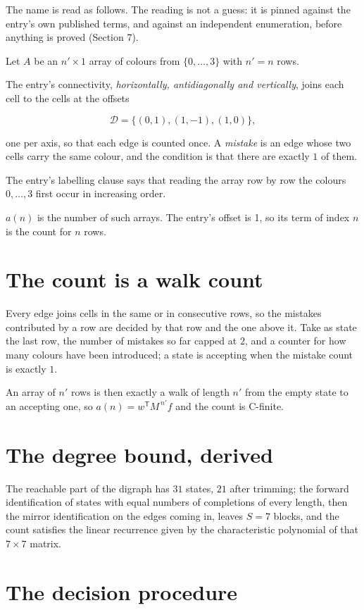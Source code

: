 \documentclass[11pt]{article}
\theoremstyle{definition}
\begin{document}
The name is read as follows. The reading is not a guess: it is pinned against the entry's own published terms, and against an independent enumeration, before anything is proved (Section 7).

Let $A$ be an $n' \times 1$ array of colours from $\{0,\dots,3\}$ with $n' = n$ rows.

The entry's connectivity, {\itshape horizontally, antidiagonally and vertically}, joins each cell to the cells at the offsets

\[\mathcal{D} = \{(0,1), (1,-1), (1,0)\},\]

one per axis, so that each edge is counted once. A {\itshape mistake} is an edge whose two cells carry the same colour, and the condition is that there are exactly $1$ of them.

The entry's labelling clause says that reading the array row by row the colours $0,\dots,3$ first occur in increasing order.

$a(n)$ is the number of such arrays. The entry's offset is 1, so its term of index $n$ is the count for $n$ rows.

\section{The count is a walk count}

Every edge joins cells in the same or in consecutive rows, so the mistakes contributed by a row are decided by that row and the one above it. Take as state the last row, the number of mistakes so far capped at $2$, and a counter for how many colours have been introduced; a state is accepting when the mistake count is exactly $1$.

An array of $n'$ rows is then exactly a walk of length $n'$ from the empty state to an accepting one, so $a(n) = w^{\mathsf T}M^{\,n'}f$ and the count is C-finite.

\section{The degree bound, derived}

The reachable part of the digraph has $31$ states, $21$ after trimming; the forward identification of states with equal numbers of completions of every length, then the mirror identification on the edges coming in, leaves $S = 7$ blocks, and the count satisfies the linear recurrence given by the characteristic polynomial of that $7\times7$ matrix.

\section{The decision procedure}
\end{document}
